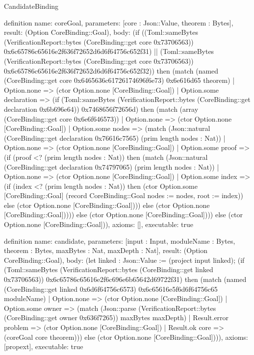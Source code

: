 \begin{lexlean}{CandidateBinding}
\begin{semanticmodule}
definition{
 name: coreGoal,
 parameters: [core : Json::Value, theorem : Bytes],
 result: (Option CoreBinding::Goal),
 body: (if ((Toml::sameBytes (VerificationReport::bytes (CoreBinding::get core 0x73706563)) 0x6c65786c65616e2f636f72652d6d6f64756c652f31) || (Toml::sameBytes (VerificationReport::bytes (CoreBinding::get core 0x73706563)) 0x6c65786c65616e2f636f72652d6d6f64756c652f32)) then (match (named (CoreBinding::get core 0x6465636c61726174696f6e73) 0x6e616d65 theorem) | Option.none => (ctor Option.none [CoreBinding::Goal]) | Option.some declaration => (if (Toml::sameBytes (VerificationReport::bytes (CoreBinding::get declaration 0x6b696e64)) 0x7468656f72656d) then (match (array (CoreBinding::get core 0x6e6f646573)) | Option.none => (ctor Option.none [CoreBinding::Goal]) | Option.some nodes => (match (Json::natural (CoreBinding::get declaration 0x76616c7565) (prim length nodes : Nat)) | Option.none => (ctor Option.none [CoreBinding::Goal]) | Option.some proof => (if (proof <? (prim length nodes : Nat)) then (match (Json::natural (CoreBinding::get declaration 0x74797065) (prim length nodes : Nat)) | Option.none => (ctor Option.none [CoreBinding::Goal]) | Option.some index => (if (index <? (prim length nodes : Nat)) then (ctor Option.some [CoreBinding::Goal] (record CoreBinding::Goal {nodes := nodes, root := index})) else (ctor Option.none [CoreBinding::Goal]))) else (ctor Option.none [CoreBinding::Goal])))) else (ctor Option.none [CoreBinding::Goal]))) else (ctor Option.none [CoreBinding::Goal])),
 axioms: [],
 executable: true
}

definition{
 name: candidate,
 parameters: [input : Input, moduleName : Bytes, theorem : Bytes, maxBytes : Nat, maxDepth : Nat],
 result: (Option CoreBinding::Goal),
 body: (let linked : Json::Value := (project input linked); (if (Toml::sameBytes (VerificationReport::bytes (CoreBinding::get linked 0x73706563)) 0x6c65786c65616e2f6c696e6b65642d69722f31) then (match (named (CoreBinding::get linked 0x6d6f64756c6573) 0x6c65616e5f6d6f64756c65 moduleName) | Option.none => (ctor Option.none [CoreBinding::Goal]) | Option.some owner => (match (Json::parse (VerificationReport::bytes (CoreBinding::get owner 0x636f7265)) maxBytes maxDepth) | Result.error problem => (ctor Option.none [CoreBinding::Goal]) | Result.ok core => (coreGoal core theorem))) else (ctor Option.none [CoreBinding::Goal]))),
 axioms: [propext],
 executable: true
}


\end{semanticmodule}
\end{lexlean}
